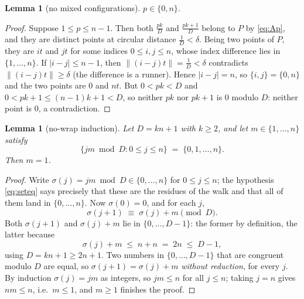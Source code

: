 \documentclass[11pt,a4paper]{article}
\theoremstyle{plain}
\newtheorem{lemma}[theorem]{Lemma}
\theoremstyle{definition}
\theoremstyle{remark}
\newcommand{\norm}[1]{\lVert #1 \rVert}
\begin{document}
\begin{lemma}[no mixed configurations]\label{lem:mixed}
$p \in \{0, n\}$.
\end{lemma}

\begin{proof}
Suppose $1 \le p \le n-1$. Then both $\tfrac{pk}{D}$ and
$\tfrac{pk+1}{D}$ belong to $P$ by \eqref{eq:Ap}, and they are distinct
points at circular distance $\tfrac1D < \delta$. Being two points of $P$,
they are $it$ and $jt$ for some indices $0 \le i, j \le n$, whose index
difference lies in $\{1, \dots, n\}$. If $|i - j| \le n - 1$, then
$\norm{(i-j)t} = \tfrac1D < \delta$ contradicts $\norm{(i-j)t} \ge \delta$
(the difference is a runner). Hence $|i-j| = n$, so $\{i, j\} = \{0, n\}$
and the two points are $0$ and $nt$. But $0 < pk < D$ and
$0 < pk + 1 \le (n-1)k + 1 < D$, so neither $pk$ nor $pk+1$ is $0$ modulo
$D$: neither point is $0$, a contradiction.
\end{proof}

\begin{lemma}[no-wrap induction]\label{lem:nowrap}
Let $D = kn+1$ with $k \ge 2$, and let $m \in \{1, \dots, n\}$ satisfy
\begin{equation}\label{eq:seteq}
  \{ jm \bmod D : 0 \le j \le n \} \;=\; \{0, 1, \dots, n\}.
\end{equation}
Then $m = 1$.
\end{lemma}

\begin{proof}
Write $\sigma(j) = jm \bmod D \in \{0, \dots, n\}$ for $0 \le j \le n$;
the hypothesis \eqref{eq:seteq} says precisely that these are the residues of
the walk and that all of them land in $\{0, \dots, n\}$. Now $\sigma(0) = 0$,
and for each $j$,
\[
  \sigma(j+1) \;\equiv\; \sigma(j) + m \pmod D .
\]
Both $\sigma(j+1)$ and $\sigma(j) + m$ lie in $\{0, \dots, D-1\}$: the
former by definition, the latter because
\[
  \sigma(j) + m \;\le\; n + n \;=\; 2n \;\le\; D - 1,
\]
using $D = kn + 1 \ge 2n + 1$. Two numbers in $\{0, \dots, D-1\}$ that are
congruent modulo $D$ are equal, so $\sigma(j+1) = \sigma(j) + m$
\emph{without reduction}, for every $j$. By induction $\sigma(j) = jm$ as
integers, so $jm \le n$ for all $j \le n$; taking $j = n$ gives $nm \le n$,
i.e.\ $m \le 1$, and $m \ge 1$ finishes the proof.
\end{proof}
\end{document}
